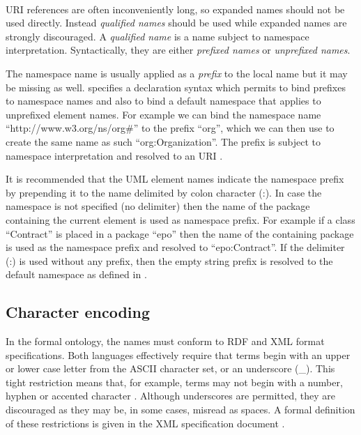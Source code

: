 	\\
	
	URI references are often inconveniently long, so expanded names should not be used directly. Instead \textit{qualified names} should be used while expanded names are strongly discouraged. A \textit{qualified name} is a name subject to namespace interpretation. Syntactically, they are either \textit{prefixed names} or \textit{unprefixed names}.

	
	The namespace name is usually applied as a \textit{prefix} to the local name but it may be missing as well. \cite{xml-namespaces} specifies a declaration syntax which permits to bind prefixes to namespace names and also to bind a default namespace that applies to unprefixed element names. For example we can bind the namespace name ``http://www.w3.org/ns/org\#'' to the prefix ``org'', which we can then use to create the same name as such ``org:Organization''. The prefix is subject to namespace interpretation and resolved to an URI \cite{xml-namespaces}.

	It is recommended that the UML element names indicate the namespace prefix by prepending it to the name delimited by colon character (:). In case the namespace is not specified (no delimiter) then the name of the package containing the current element is used as namespace prefix. For example if a class ``Contract'' is placed in a package ``epo'' then the name of the containing package is used as the namespace prefix and resolved to ``epo:Contract''. If the delimiter (:) is used without any prefix, then the empty string prefix is resolved to the default namespace as defined in \citep{xml-namespaces}.

	\subsection{Character encoding}
	\label{sec:charset}
	
	In the formal ontology, the names must conform to RDF \cite{rdf11} and XML\cite{xml1-spec} format specifications. Both languages effectively require that terms begin with an upper or lower case letter from the ASCII character set, or an underscore (\_). This tight restriction means that, for example, terms may not begin with a number, hyphen or accented character \cite{d3.1-2015}. Although underscores are permitted, they are discouraged as they may be, in some cases, misread as spaces. A formal definition of these restrictions is given in the XML specification document \cite{xml1-spec}.
	
